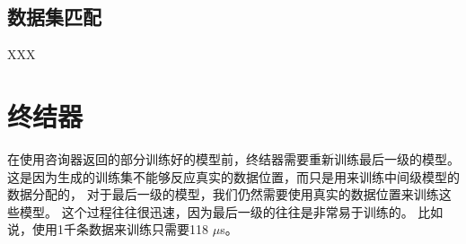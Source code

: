 




\subsection{数据集匹配}

XXX

\section{终结器}

在使用咨询器返回的部分训练好的模型前，终结器需要重新训练最后一级的模型。
这是因为生成的训练集不能够反应真实的数据位置，而只是用来训练中间级模型的数据分配的，
对于最后一级的模型，我们仍然需要使用真实的数据位置来训练这些模型。
这个过程往往很迅速，因为最后一级的往往是非常易于训练的{\lr}。
比如说，使用1千条数据来训练{\lr}只需要118 $\mu$s。


